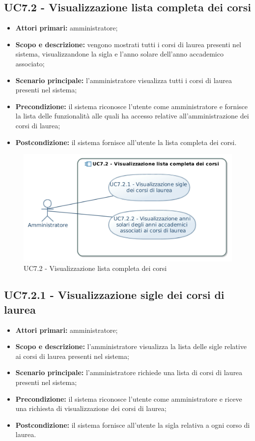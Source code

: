 \documentclass[AnalisiDeiRequisiti.tex]{subfiles}
\begin{document}
\subsection{UC7.2 - Visualizzazione lista completa dei corsi}
\begin{itemize}
	\item \textbf{Attori primari:} amministratore;
	\item \textbf{Scopo e descrizione:} vengono mostrati tutti i corsi di laurea presenti nel sistema, visualizzandone la sigla e l'anno solare dell'anno accademico associato;
	\item \textbf{Scenario principale:} l'amministratore visualizza tutti i corsi di laurea presenti nel sistema;
	\item \textbf{Precondizione:} il sistema riconosce l'utente come amministratore e fornisce la lista delle funzionalità alle quali ha accesso relative all'amministrazione dei corsi di laurea; 
	\item \textbf{Postcondizione:} il sistema fornisce all'utente la lista completa dei corsi.
\end{itemize}
\begin{figure}[H]
	\centering
	\includegraphics[width=0.8\linewidth]{UC7_2.jpg}
	\caption{UC7.2 - Visualizzazione lista completa dei corsi}
	\label{fig:UC7.2 - Visualizzazione lista completa dei corsi}
\end{figure}
\subsection{UC7.2.1 - Visualizzazione sigle dei corsi di laurea}
\begin{itemize}
	\item \textbf{Attori primari:} amministratore;
	\item \textbf{Scopo e descrizione:} l'amministratore visualizza la lista delle sigle relative ai corsi di laurea presenti nel sistema;
	\item \textbf{Scenario principale:} l'amministratore richiede una lista di corsi di laurea presenti nel sistema;
	\item \textbf{Precondizione:} il sistema riconosce l'utente come amministratore e riceve una richiesta di visualizzazione dei corsi di laurea; 
	\item \textbf{Postcondizione:} il sistema fornisce all'utente la sigla relativa a ogni corso di laurea.
\end{itemize}
\end{document}
